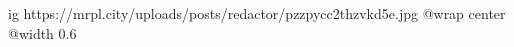  
 
 
 
 

\ifcmt
  ig https://mrpl.city/uploads/posts/redactor/pzzpycc2thzvkd5e.jpg
  @wrap center
  @width 0.6
\fi
